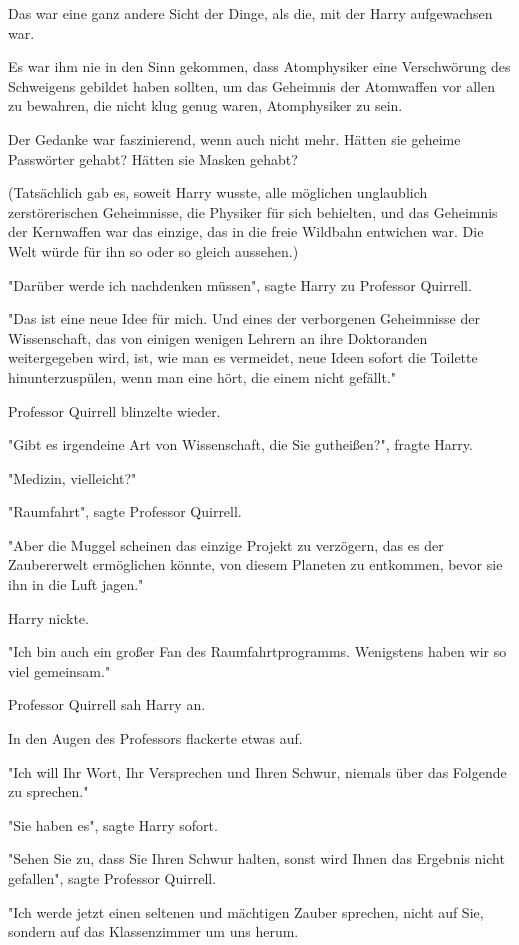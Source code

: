 {Das war eine ganz andere Sicht der Dinge, als die, mit der Harry aufgewachsen war.

Es war ihm nie in den Sinn gekommen, dass Atomphysiker eine Verschwörung des Schweigens gebildet haben sollten, um das Geheimnis der Atomwaffen vor allen zu bewahren, die nicht klug genug waren, Atomphysiker zu sein.

Der Gedanke war faszinierend, wenn auch nicht mehr. Hätten sie geheime Passwörter gehabt? Hätten sie Masken gehabt?

(Tatsächlich gab es, soweit Harry wusste, alle möglichen unglaublich zerstörerischen Geheimnisse, die Physiker für sich behielten, und das Geheimnis der Kernwaffen war das einzige, das in die freie Wildbahn entwichen war. Die Welt würde für ihn so oder so gleich aussehen.)

"Darüber werde ich nachdenken müssen", sagte Harry zu Professor Quirrell.

"Das ist eine neue Idee für mich. Und eines der verborgenen Geheimnisse der Wissenschaft, das von einigen wenigen Lehrern an ihre Doktoranden weitergegeben wird, ist, wie man es vermeidet, neue Ideen sofort die Toilette hinunterzuspülen, wenn man eine hört, die einem nicht gefällt."

Professor Quirrell blinzelte wieder.

"Gibt es irgendeine Art von Wissenschaft, die Sie gutheißen?", fragte Harry.

"Medizin, vielleicht?"

"Raumfahrt", sagte Professor Quirrell.

"Aber die Muggel scheinen das einzige Projekt zu verzögern, das es der Zaubererwelt ermöglichen könnte, von diesem Planeten zu entkommen, bevor sie ihn in die Luft jagen."

Harry nickte.

"Ich bin auch ein großer Fan des Raumfahrtprogramms. Wenigstens haben wir so viel gemeinsam."

Professor Quirrell sah Harry an.

In den Augen des Professors flackerte etwas auf.

"Ich will Ihr Wort, Ihr Versprechen und Ihren Schwur, niemals über das Folgende zu sprechen."

"Sie haben es", sagte Harry sofort.

"Sehen Sie zu, dass Sie Ihren Schwur halten, sonst wird Ihnen das Ergebnis nicht gefallen", sagte Professor Quirrell.

"Ich werde jetzt einen seltenen und mächtigen Zauber sprechen, nicht auf Sie, sondern auf das Klassenzimmer um uns herum.

}
